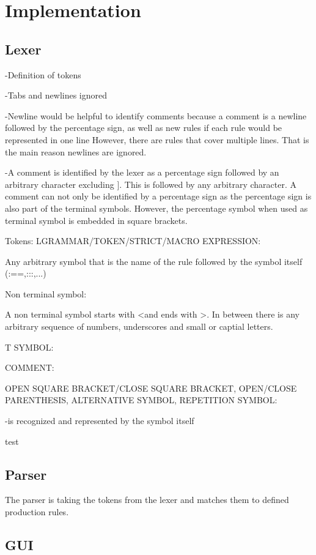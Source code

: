 

\chapter{Implementation}\label{cha:Implementation}

\section{Lexer}\label{sec:ImplementationLexer}

-Definition of tokens 

-Tabs and newlines ignored

-Newline would be helpful to identify comments because a comment is a newline followed by the percentage sign, as well as new rules if each rule would be represented in one line
However, there are rules that cover multiple lines. That is the main reason newlines are ignored. 

-A comment is identified by the lexer as a percentage sign followed by an arbitrary character excluding \dq ]\dq. This is followed by any arbitrary character. A comment can not only be identified by a percentage sign as the percentage sign is also part of the terminal symbols. However, the percentage symbol when used as terminal symbol is embedded in square brackets. 

Tokens:
LGRAMMAR/TOKEN/STRICT/MACRO EXPRESSION:

Any arbitrary symbol that is the name of the rule followed by the symbol itself (:==,:::,...)

Non terminal symbol:

A non terminal symbol starts with \dq <\dq and ends with \dq >\dq. In between there is any arbitrary sequence of numbers, underscores and small or captial letters.

T SYMBOL:

COMMENT:
        

OPEN SQUARE BRACKET/CLOSE SQUARE BRACKET, OPEN/CLOSE PARENTHESIS, ALTERNATIVE SYMBOL, REPETITION SYMBOL:

-is recognized and represented by the symbol itself

test
\section{Parser}\label{sec:ImplementationParser}

The parser is taking the tokens from the lexer and matches them to defined production rules.

\section{GUI}\label{sec:GUI}

